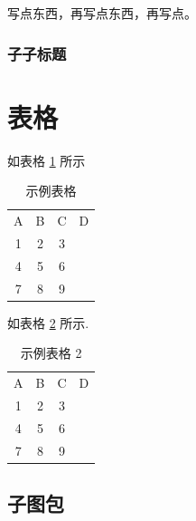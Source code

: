 \documentclass[14pt,a4paper,UTF8,twoside]{article}
\begin{document}
写点东西，再写点东西，再写点。

\subsubsection{子子标题}

\section{表格}

如表格 \ref{tab:my_label} 所示

\begin{table} [H]
    \centering
    \begin{tabular}{cccc} %
        \toprule
        A & B & C & D \\
        1 & 2 & 3     \\
        \midrule
        4 & 5 & 6     \\
        7 & 8 & 9     \\
        \bottomrule
    \end{tabular}
    \caption{示例表格}
    \label{tab:my_label}
\end{table}

如表格 \ref{tab:my_label_2} 所示.

\begin{table} [H]
    \centering
    \begin{tabular}{cccc} %
        \toprule
        A & B & C & D \\
        1 & 2 & 3     \\
        \midrule
        4 & 5 & 6     \\
        7 & 8 & 9     \\
        \bottomrule
    \end{tabular}
    \caption{示例表格 2}
    \label{tab:my_label_2}
\end{table}

\subsection{子图包}
\end{document}
